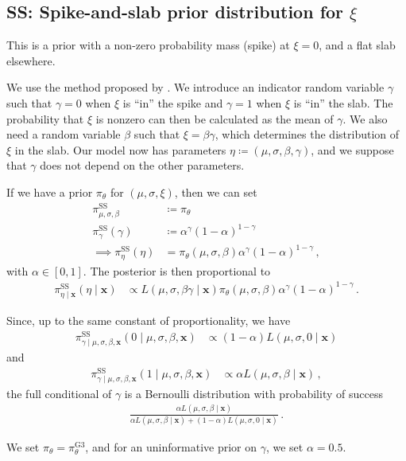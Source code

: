 \documentclass{article}
\begin{document}
\subsection{SS: Spike-and-slab prior distribution for \boldmath$\xi$}
\label{section:prior-ss}
%

%
This is a prior with a non-zero probability mass (spike) at $\xi = 0$,
and a flat slab elsewhere.
%

%
We use the method proposed by \cite{kuo1998}.
We introduce an indicator random variable $\gamma$ such that
$\gamma = 0$ when $\xi$ is ``in'' the spike
and $\gamma = 1$ when $\xi$ is ``in'' the slab.
The probability that $\xi$ is nonzero can then be calculated
as the mean of $\gamma$.
We also need a random variable $\beta$ such that $\xi = \beta \gamma$,
which determines the distribution of $\xi$ in the slab.
Our model now has parameters $\eta \coloneqq (\mu, \sigma, \beta, \gamma)$,
and we suppose that $\gamma$ does not depend on the other parameters.
%

%
If we have a prior $\pi_\theta$ for $(\mu, \sigma, \xi)$, then we can set
%
\begin{align*}
	\pi_{\mu, \sigma, \beta}^{\text{SS}} &\coloneqq \pi_\theta \\
	\pi_\gamma^{\text{SS}}(\gamma)
		&\coloneqq \alpha ^ \gamma (1 - \alpha) ^ {1 - \gamma} \\
	\implies \pi_{\eta}^{\text{SS}}(\eta)
		&= \pi_\theta(\mu, \sigma, \beta)
		\alpha ^ \gamma (1 - \alpha) ^ {1 - \gamma} \,,
\end{align*}
%
with $\alpha \in [0, 1]$. The posterior is then proportional to
%
\begin{align*}
	\pi_{\eta \mid \mathbf{x}}^{\text{SS}}(\eta \mid \mathbf{x}) &\propto
		L(\mu, \sigma, \beta \gamma \mid \mathbf{x})
		\pi_\theta(\mu, \sigma, \beta)
		\alpha ^ \gamma (1 - \alpha) ^ {1 - \gamma} \,.
\end{align*}
%

%
Since, up to the same constant of proportionality, we have
%
\begin{align*}
	\pi_{\gamma \mid \mu, \sigma, \beta, \mathbf{x}}^{\text{SS}}
		(0 \mid \mu, \sigma, \beta, \mathbf{x}) &\propto
		(1 - \alpha) L(\mu, \sigma, 0 \mid \mathbf{x})
\end{align*}
and
\begin{align*}
	\pi_{\gamma \mid \mu, \sigma, \beta, \mathbf{x}}^{\text{SS}}
		(1 \mid \mu, \sigma, \beta, \mathbf{x}) &\propto
		\alpha L(\mu, \sigma, \beta \mid \mathbf{x}) \,,
\end{align*}
%
the full conditional of $\gamma$ is a Bernoulli distribution
with probability of success
%
\begin{align*}
	\frac{\alpha L(\mu, \sigma, \beta \mid \mathbf{x})}
		{\alpha L(\mu, \sigma, \beta \mid \mathbf{x})
		+ (1 - \alpha) L(\mu, \sigma, 0 \mid \mathbf{x})} \,.
\end{align*}
%

%
We set $\pi_\theta = \pi_\theta^{\text{G3}}$,
and for an uninformative prior on $\gamma$, we set $\alpha = 0.5$.
%
\printbibliography
%
\end{document}
